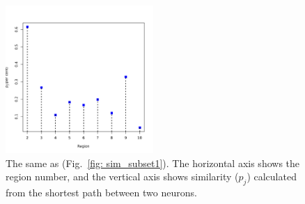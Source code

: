 \begin{figure}
        \centering
        \includegraphics[width=0.5\textwidth]{../../images0.01/M31/2D/image_subsets/similarity_plot_sfr.pdf}
    \caption{The same as (Fig.~\ref{fig: sim_subset1}). The horizontal axis shows the region number, and the vertical axis shows similarity ($p_j$) calculated from the shortest path between two neurons.}
    \label{fig: sim_subset10}
\end{figure}
